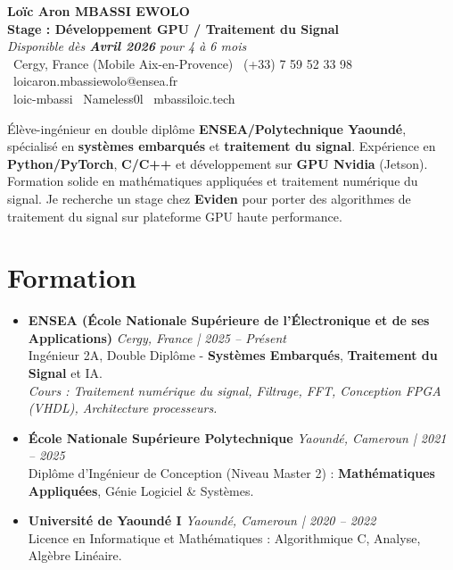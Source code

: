 \documentclass[a4paper,11pt]{article}
\begin{document}
\begin{center}
    {\Large \textbf{Loïc Aron MBASSI EWOLO}} \\ \vspace{4pt}
    \textbf{\large Stage : Développement GPU / Traitement du Signal} \\
    \textit{\small Disponible dès \textbf{Avril 2026} pour 4 à 6 mois}\\
    \vspace{4pt}
    \small
    \faMapMarker\ Cergy, France (Mobile Aix-en-Provence) \quad
    \faPhone\ (+33) 7 59 52 33 98 \quad
    \faEnvelope\ loicaron.mbassiewolo@ensea.fr \\ \vspace{2pt}
    \faLinkedin\ loic-mbassi \quad
    \faGithub\ Nameless0l \quad
    \faGlobe\ mbassiloic.tech
\end{center}

\vspace{-6pt}

\noindent\small{Élève-ingénieur en double diplôme \textbf{ENSEA/Polytechnique Yaoundé}, spécialisé en \textbf{systèmes embarqués} et \textbf{traitement du signal}. Expérience en \textbf{Python/PyTorch}, \textbf{C/C++} et développement sur \textbf{GPU Nvidia} (Jetson). Formation solide en mathématiques appliquées et traitement numérique du signal. Je recherche un stage chez \textbf{Eviden} pour porter des algorithmes de traitement du signal sur plateforme GPU haute performance.}

\section{Formation}
\begin{itemize}[leftmargin=*, label={.}, nosep]
    \item \textbf{ENSEA (École Nationale Supérieure de l'Électronique et de ses Applications)} \hfill \textit{Cergy, France | 2025 -- Présent} \\
    \small{Ingénieur 2A, Double Diplôme - \textbf{Systèmes Embarqués}, \textbf{Traitement du Signal} et IA.} \\
    \textit{\small{Cours : Traitement numérique du signal, Filtrage, FFT, Conception FPGA (VHDL), Architecture processeurs.}}
    \vspace{2pt}
    \item \textbf{École Nationale Supérieure Polytechnique} \hfill \textit{Yaoundé, Cameroun | 2021 -- 2025} \\
    \small{Diplôme d'Ingénieur de Conception (Niveau Master 2) : \textbf{Mathématiques Appliquées}, Génie Logiciel \& Systèmes.}
    \item \textbf{Université de Yaoundé I} \hfill \textit{Yaoundé, Cameroun | 2020 -- 2022} \\
    \small{Licence en Informatique et Mathématiques : Algorithmique C, Analyse, Algèbre Linéaire.}
\end{itemize}
\end{document}
